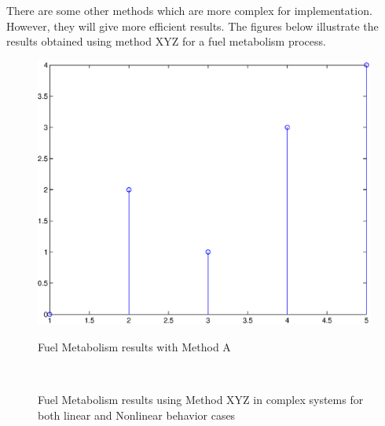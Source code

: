 \documentclass{iitthesis}
\begin{document}
 There are some other methods
which are more complex for implementation. However, they will give
more efficient results. The figures below illustrate the results
obtained using method XYZ for a fuel metabolism process.

\begin{figure}[ht]
  \centering                %
  \scalebox{0.5}            %
  {\includegraphics{matlab.ps}}   %
  \caption{Fuel Metabolism results with Method A}        %
  \label{fig:exm}                  %
\end{figure}


\begin{figure}[h]
 \vspace{10pt}
   \centering
 \mbox{\quad
       }
 \caption{Fuel Metabolism results using Method XYZ in complex systems for both linear and Nonlinear behavior cases}
 \label{fig:SubF}
 \end{figure}


\clearpage


\end{document}
